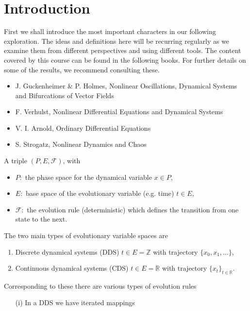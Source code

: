 \chapter{Introduction}


First we shall introduce the most important characters in our following exploration. The ideas and definitions here will be recurring regularly as we examine them from different perspectives and using different tools. The content covered by this course can be found in the following books. For further details on some of the results, we recommend consulting these. 

\begin{itemize}
\item J. Guckenheimer \& P. Holmes, Nonlinear Oscillations, Dynamical Systems and Bifurcations of Vector Fields
\item F. Verhulst, Nonlinear Differential Equations and Dynamical Systems
\item V. I. Arnold, Ordinary Differential Equations
\item S. Strogatz, Nonlinear Dynamics and Chaos
\end{itemize}

\begin{definition}
	A triple $(P,E, \mathcal{F})$, with
	\begin{itemize}
		\item $P :$ the phase space for the dynamical variable $x\in P$,
		\item  $E:$ base space of the evolutionary variable (e.g. time) $t \in E$,
		\item $\mathcal{F}: $ the evolution rule (deterministic) which defines the transition from one state to the next.
\end{itemize}
\end{definition}
The two main types of evolutionary variable spaces are
\begin{enumerate}
	\item Discrete dynamical systems (DDS) $t\in E=\mathbb{Z}$ with trajectory $\{x_0, x_1, \ldots\}$,
	\item Continuous dynamical systems (CDS) $t\in E=\mathbb{R}$ with trajectory $\{x_t\}_{t \in \mathbb{R}}$.
\end{enumerate}
Corresponding to these there are various types of evolution rules
\begin{enumerate}
	\item[(i)] In a DDS we have iterated mappings 
\end{enumerate}

